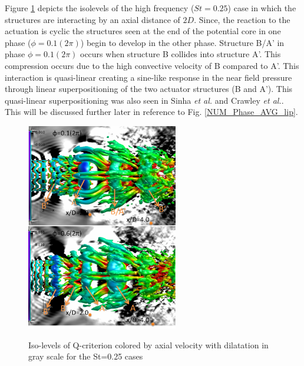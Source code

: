 \documentclass[english]{aiaa-tc}
\begin{document}
Figure \ref{fig:isolevels} depicts the isolevels of the high frequency ($St=0.25$) case in which the structures are interacting by an axial distance of $2D$.
Since, the reaction to the actuation is cyclic the structures seen at the end of the potential core in one phase ($\phi=0.1(2\pi)$) begin to develop in the other phase. Structure B/A' in phase $\phi=0.1(2\pi)$ occurs when structure B collides into structure A'. This compression occurs due to the high convective velocity of B compared to A'. This interaction is quasi-linear creating a sine-like response in the near field pressure through linear superpositioning of the two actuator structures (B and A'). This quasi-linear superpositioning was also seen in Sinha {\em et al.}\cite{sinha2013} and Crawley {\em et al.}\cite{Crawley2014}. This will be discussed further later in reference to Fig. \ref{NUM_Phase_AVG_lip}.
\begin{figure}
\begin{center}
\begin{centering}
{\includegraphics[width=2.6in]{M09St025qcritphase0106AB}}
\end{centering}
\caption{Iso-levels of Q-criterion colored by axial velocity with dilatation in gray scale for the St=0.25 cases}
\label{fig:isolevels}
\end{center}
\end{figure}
\end{document}
